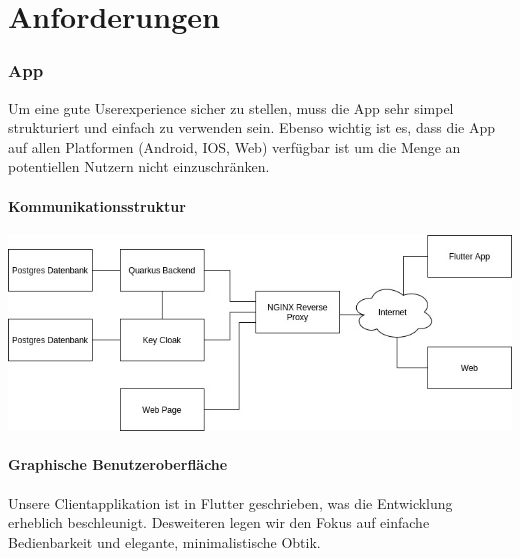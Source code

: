 \documentclass[12pt]{article}
\theoremstyle{definition}
\begin{document}
\pagebreak

\section{Anforderungen}

\subsubsection{App}

Um eine gute Userexperience sicher zu stellen, muss die App sehr simpel strukturiert und einfach zu verwenden sein. Ebenso wichtig ist es, dass die App auf allen Platformen (Android, IOS, Web) verfügbar ist um die Menge an potentiellen Nutzern nicht einzuschränken.

\paragraph{Kommunikationsstruktur}
\begin{center}

\includegraphics[width=15cm]{Kommunikationsdiagramm.jpg}

\end{center}
\pagebreak

\paragraph{Graphische Benutzeroberfläche}
\begin{flushleft}
Unsere Clientapplikation ist in Flutter geschrieben, was die Entwicklung erheblich beschleunigt. Desweiteren legen wir den Fokus auf einfache Bedienbarkeit und elegante, minimalistische Obtik.

\end{flushleft}

\begin{flushleft}

\end{flushleft}
\end{document}
